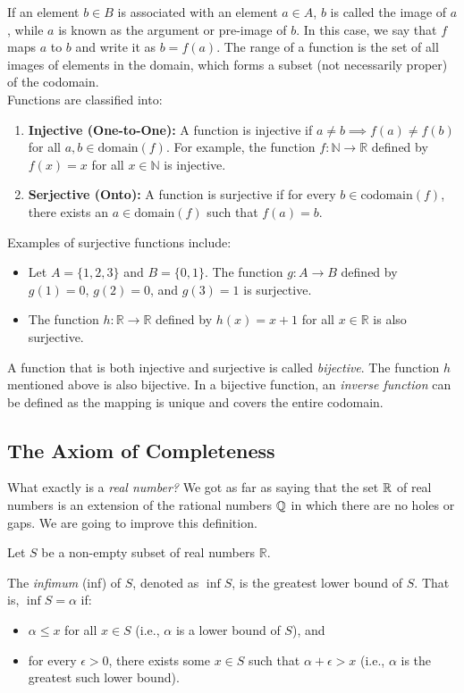 If an element $b \in B$ is associated with an element $a \in A$, $b$ is called the image of $a$, while $a$ is known as the argument or pre-image of $b$. In this case, we say that $f$ maps $a$ to $b$ and write it as $b = f(a)$. The range of a function is the set of all images of elements in the domain, which forms a subset (not necessarily proper) of the codomain. \\

Functions are classified into: 
\begin{enumerate}
    \item \textbf{Injective (One-to-One):} A function is injective if $a \neq b \implies f(a) \neq f(b)$ for all $a, b \in \text{domain}(f)$. For example, the function $f: \mathbb{N} \to \mathbb{R}$ defined by $f(x) = x$ for all $x \in \mathbb{N}$ is injective.
    \item \textbf{Serjective (Onto):} A function is surjective if for every $b \in \text{codomain}(f)$, there exists an $a \in \text{domain}(f)$ such that $f(a) = b$. 
\end{enumerate}

Examples of surjective functions include:
\begin{itemize}
    \item Let $A = \{1, 2, 3\}$ and $B = \{0, 1\}$. The function $g: A \to B$ defined by $g(1) = 0$, $g(2) = 0$, and $g(3) = 1$ is surjective.
    \item The function $h: \mathbb{R} \to \mathbb{R}$ defined by $h(x) = x + 1$ for all $x \in \mathbb{R}$ is also surjective.  
\end{itemize}

A function that is both injective and surjective is called \textit{bijective}. The function $h$ mentioned above is also bijective. In a bijective function, an \textit{inverse function} can be defined as the mapping is unique and covers the entire codomain.

\subsection{The Axiom of Completeness}

What exactly is a \textit{real number?} We got as far as saying that the set $\mathbb{R}$ of real numbers is an extension of the rational numbers $\mathbb{Q}$ in which there are no holes or gaps. We are going to improve this definition. 

Let $S$ be a non-empty subset of real numbers $\mathbb{R}$.

\begin{definition}
    The \textit{infimum} (inf) of $S$, denoted as $\inf S$, is the greatest lower bound of $S$. That is, $\inf S = \alpha$ if:
\begin{itemize}
    \item $\alpha \leq x$ for all $x \in S$ (i.e., $\alpha$ is a lower bound of $S$), and
    \item for every $\epsilon > 0$, there exists some $x \in S$ such that $\alpha + \epsilon > x$ (i.e., $\alpha$ is the greatest such lower bound).
\end{itemize}
\end{definition}

